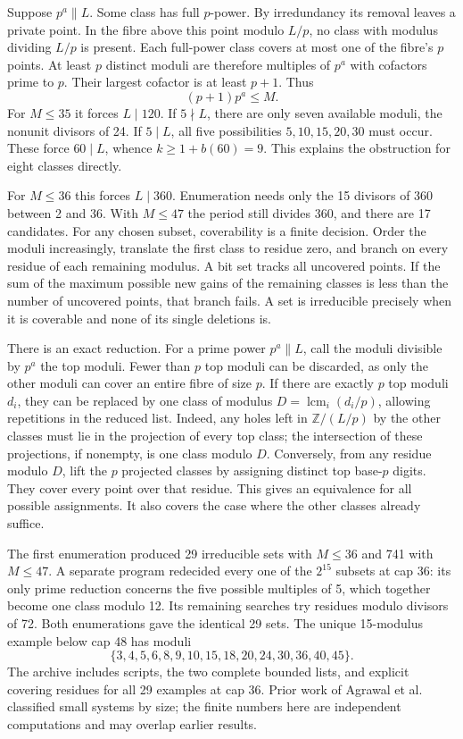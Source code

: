 \documentclass[11pt]{article}
\newcommand{\head}[1]{\vspace{4pt}{\large\bfseries\color{ink}#1}\par}
\newcommand{\lcm}{\operatorname{lcm}}
\begin{document}
\newpage
\head{4. Certifying the finite minima}
Suppose $p^a\parallel L$. Some class has full $p$-power. By irredundancy its removal leaves a private point. In the fibre above this point modulo $L/p$, no class with modulus dividing $L/p$ is present. Each full-power class covers at most one of the fibre's $p$ points. At least $p$ distinct moduli are therefore multiples of $p^a$ with cofactors prime to $p$. Their largest cofactor is at least $p+1$. Thus
\[
 (p+1)p^a\le M.
\]
For $M\le35$ it forces $L\mid120$. If $5\nmid L$, there are only seven available moduli, the nonunit divisors of 24. If $5\mid L$, all five possibilities $5,10,15,20,30$ must occur. These force $60\mid L$, whence $k\ge1+b(60)=9$. This explains the obstruction for eight classes directly.

For $M\le36$ this forces $L\mid360$. Enumeration needs only the 15 divisors of 360 between 2 and 36. With $M\le47$ the period still divides 360, and there are 17 candidates. For any chosen subset, coverability is a finite decision. Order the moduli increasingly, translate the first class to residue zero, and branch on every residue of each remaining modulus. A bit set tracks all uncovered points. If the sum of the maximum possible new gains of the remaining classes is less than the number of uncovered points, that branch fails. A set is irreducible precisely when it is coverable and none of its single deletions is.

There is an exact reduction. For a prime power $p^a\parallel L$, call the moduli divisible by $p^a$ the top moduli. Fewer than $p$ top moduli can be discarded, as only the other moduli can cover an entire fibre of size $p$. If there are exactly $p$ top moduli $d_i$, they can be replaced by one class of modulus $D=\lcm_i(d_i/p)$, allowing repetitions in the reduced list. Indeed, any holes left in $\mathbb Z/(L/p)$ by the other classes must lie in the projection of every top class; the intersection of these projections, if nonempty, is one class modulo $D$. Conversely, from any residue modulo $D$, lift the $p$ projected classes by assigning distinct top base-$p$ digits. They cover every point over that residue. This gives an equivalence for all possible assignments. It also covers the case where the other classes already suffice.

The first enumeration produced 29 irreducible sets with $M\le36$ and 741 with $M\le47$. A separate program redecided every one of the $2^{15}$ subsets at cap 36: its only prime reduction concerns the five possible multiples of 5, which together become one class modulo 12. Its remaining searches try residues modulo divisors of 72. Both enumerations gave the identical 29 sets. The unique 15-modulus example below cap 48 has moduli
\[
 \{3,4,5,6,8,9,10,15,18,20,24,30,36,40,45\}.
\]
The archive includes scripts, the two complete bounded lists, and explicit covering residues for all 29 examples at cap 36. Prior work of Agrawal et al. classified small systems by size; the finite numbers here are independent computations and may overlap earlier results.
\end{document}
